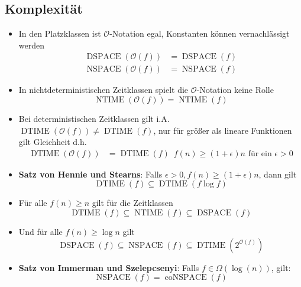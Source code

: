 \documentclass[landscape, 8pt, a4paper]{extarticle}
\begin{document}
\begin{multicols}{3}
	\section{Komplexität}
	\begin{itemize}
		\item In den Platzklassen ist $\mathcal O$-Notation egal, Konstanten können vernachlässigt werden
		\begin{align*}
			\operatorname{DSPACE}(\mathcal O(f))&=\operatorname{DSPACE}(f)\\
			\operatorname{NSPACE}(\mathcal O(f))&=\operatorname{NSPACE}(f)
		\end{align*}
		\item In nichtdeterministischen Zeitklassen spielt die $\mathcal O$-Notation keine Rolle
		\begin{equation*}
			\operatorname{NTIME}(\mathcal O(f))=\operatorname{NTIME}(f)
		\end{equation*}
		\item Bei deterministischen Zeitklassen gilt i.A. $\operatorname{DTIME}(\mathcal O(f))\not=\operatorname{DTIME}(f)$, nur für größer als lineare Funktionen gilt Gleichheit d.h.
		\begin{align*}
			\operatorname{DTIME}(\mathcal O(f))&=\operatorname{DTIME}(f) \enspace f(n)\geq (1+\epsilon)n\text{ für ein }\epsilon>0
		\end{align*}
		\item \textbf{Satz von Hennie und Stearns}: Falls $\epsilon>0, f(n)\geq (1+\epsilon)n$, dann gilt
		\begin{equation*}
			\operatorname{DTIME}(f)\subseteq\operatorname{DTIME}(f\log f)
		\end{equation*}
		\item Für alle $f(n)\geq n$ gilt für die Zeitklassen
		\begin{equation*}
			\operatorname{DTIME}(f)\subseteq\operatorname{NTIME}(f)\subseteq\operatorname{DSPACE}(f)
		\end{equation*}
		\item Und für alle $f(n)\geq \log n$ gilt
		\begin{equation*}
			\operatorname{DSPACE}(f)\subseteq\operatorname{NSPACE}(f)\subseteq\operatorname{DTIME}(2^{\mathcal O(f)})
		\end{equation*}
		\item \textbf{Satz von Immerman und Szelepcsenyi}: Falls $f\in \Omega(\log(n))$, gilt:
		\begin{equation*}
			\operatorname{NSPACE}(f)=\operatorname{coNSPACE}(f)

\end{equation*}
\end{itemize}
\end{multicols}
\end{document}
